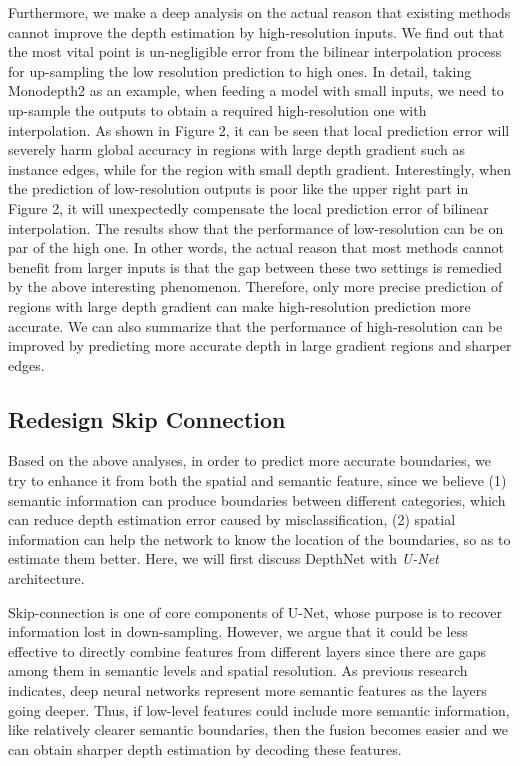\documentclass[letterpaper]{article} \usepackage{aaai21}  \usepackage{times}  \usepackage{helvet} \usepackage{courier}  \usepackage[hyphens]{url}  \usepackage{graphicx} \urlstyle{rm} \def\UrlFont{\rm}  \usepackage{natbib}  \usepackage{caption} \frenchspacing  \setlength{\pdfpagewidth}{8.5in}  \setlength{\pdfpageheight}{11in}  \usepackage{booktabs}
\begin{document}
Furthermore, we make a deep analysis on the actual reason that existing methods cannot improve the depth estimation by high-resolution inputs. We find out that the most vital point is 
un-negligible error from the bilinear interpolation process for up-sampling the low resolution prediction to high ones. In detail, taking Monodepth2\cite{godard2019digging} as an example, 
when feeding a model with small inputs, we need to up-sample the outputs to obtain a required high-resolution one with interpolation. As shown in Figure 2, it can be seen that local 
prediction error will severely harm global accuracy in regions with large depth gradient such as instance edges, while for the region with small depth gradient. 
Interestingly, when the prediction of low-resolution outputs is poor like the upper right part in Figure 2, it will unexpectedly compensate the local prediction error of bilinear interpolation. 
The results show that the performance of low-resolution can be on par of the high one. In other words, the actual reason that most methods cannot benefit from larger inputs is that the 
gap between these two settings is remedied by the above interesting phenomenon. Therefore, only more precise prediction of regions with large depth gradient can make high-resolution prediction
more accurate. We can also summarize that the performance of high-resolution can be improved by predicting more accurate depth in large gradient regions and sharper edges.

\subsection{Redesign Skip Connection}
Based on the above analyses, in order to predict more accurate boundaries, we try to enhance it from both the spatial and semantic feature, since we believe (1) semantic information 
can produce boundaries between different categories, which can reduce depth estimation error caused by misclassification, (2) spatial information can help the network to know the location of
the boundaries, so as to estimate them better. Here, we will first discuss DepthNet with \textit{U-Net} architecture.

Skip-connection is one of core components of U-Net, whose purpose is to recover information lost in down-sampling. However, we argue that it could be less 
effective to directly combine features from different layers since there are gaps among them in semantic levels and spatial resolution. As previous research\cite{zhang2018exfuse} indicates, 
deep neural networks represent more semantic features as the layers going deeper. Thus, if low-level features could include more semantic information, like relatively clearer semantic boundaries, 
then the fusion becomes easier and we can obtain sharper depth estimation by decoding these features.
\end{document}
